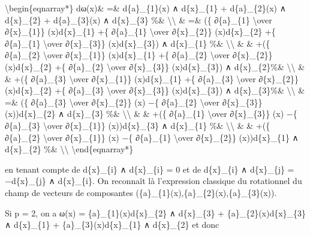 \documentclass[]{article}
\begin{document}
\textbackslash{}begin\{eqnarray*\} dω(x)\& =\& d\{a\}\_\{1\}(x) ∧
d\{x\}\_\{1\} + d\{a\}\_\{2\}(x) ∧ d\{x\}\_\{2\} + d\{a\}\_\{3\}(x) ∧
d\{x\}\_\{3\} \%\& \textbackslash{}\textbackslash{} \& =\& (\{
∂\{a\}\_\{1\} \textbackslash{}over ∂\{x\}\_\{1\}\} (x)d\{x\}\_\{1\} +\{
∂\{a\}\_\{1\} \textbackslash{}over ∂\{x\}\_\{2\}\} (x)d\{x\}\_\{2\} +\{
∂\{a\}\_\{1\} \textbackslash{}over ∂\{x\}\_\{3\}\} (x)d\{x\}\_\{3\}) ∧
d\{x\}\_\{1\} \%\& \textbackslash{}\textbackslash{} \& \& +(\{
∂\{a\}\_\{2\} \textbackslash{}over ∂\{x\}\_\{1\}\} (x)d\{x\}\_\{1\} +\{
∂\{a\}\_\{2\} \textbackslash{}over ∂\{x\}\_\{2\}\} (x)d\{x\}\_\{2\} +\{
∂\{a\}\_\{2\} \textbackslash{}over ∂\{x\}\_\{3\}\} (x)d\{x\}\_\{3\}) ∧
d\{x\}\_\{2\}\%\& \textbackslash{}\textbackslash{} \& \& +(\{
∂\{a\}\_\{3\} \textbackslash{}over ∂\{x\}\_\{1\}\} (x)d\{x\}\_\{1\} +\{
∂\{a\}\_\{3\} \textbackslash{}over ∂\{x\}\_\{2\}\} (x)d\{x\}\_\{2\} +\{
∂\{a\}\_\{3\} \textbackslash{}over ∂\{x\}\_\{3\}\} (x)d\{x\}\_\{3\}) ∧
d\{x\}\_\{3\}\%\& \textbackslash{}\textbackslash{} \& =\& (\{
∂\{a\}\_\{3\} \textbackslash{}over ∂\{x\}\_\{2\}\} (x) −\{ ∂\{a\}\_\{2\}
\textbackslash{}over ∂\{x\}\_\{3\}\} (x))d\{x\}\_\{2\} ∧ d\{x\}\_\{3\}
\%\& \textbackslash{}\textbackslash{} \& \& +(\{ ∂\{a\}\_\{1\}
\textbackslash{}over ∂\{x\}\_\{3\}\} (x) −\{ ∂\{a\}\_\{3\}
\textbackslash{}over ∂\{x\}\_\{1\}\} (x))d\{x\}\_\{3\} ∧ d\{x\}\_\{1\}
\%\& \textbackslash{}\textbackslash{} \& \& +(\{ ∂\{a\}\_\{2\}
\textbackslash{}over ∂\{x\}\_\{1\}\} (x) −\{ ∂\{a\}\_\{1\}
\textbackslash{}over ∂\{x\}\_\{2\}\} (x))d\{x\}\_\{1\} ∧ d\{x\}\_\{2\}
\%\& \textbackslash{}\textbackslash{} \textbackslash{}end\{eqnarray*\}

en tenant compte de d\{x\}\_\{i\} ∧ d\{x\}\_\{i\} = 0 et de
d\{x\}\_\{i\} ∧ d\{x\}\_\{j\} = −d\{x\}\_\{j\} ∧ d\{x\}\_\{i\}. On
reconnaît là l'expression classique du rotationnel du champ de vecteurs
de composantes (\{a\}\_\{1\}(x),\{a\}\_\{2\}(x),\{a\}\_\{3\}(x)).

Si p = 2, on a ω(x) = \{a\}\_\{1\}(x)d\{x\}\_\{2\} ∧ d\{x\}\_\{3\} +
\{a\}\_\{2\}(x)d\{x\}\_\{3\} ∧ d\{x\}\_\{1\} +
\{a\}\_\{3\}(x)d\{x\}\_\{1\} ∧ d\{x\}\_\{2\} et donc
\end{document}
